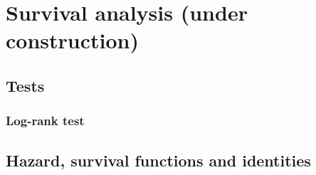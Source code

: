 \documentclass[]{article}
\begin{document}
\clearpage


\section{Survival analysis (under construction)}
\subsection{Tests}
\subsubsection{Log-rank test}
\subsection{Hazard, survival functions and identities}

\end{document}
